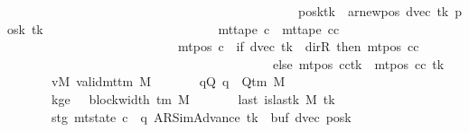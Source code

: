 \begin{isabellebody}
\ \ \ \ \ \ \ \ \ \ \ \ \ \ \ \ \ \ \ \ \ \ \ \ \ \ \ \ \ \ \ \ \ \ \ \ \ \ \ \ \ \ \ \ \ \ posk{\isacharparenleft}{\kern0pt}tk\ {\isacharcolon}{\kern0pt}{\isacharequal}{\kern0pt}\ ar{\isacharunderscore}{\kern0pt}newpos\ {\isacharparenleft}{\kern0pt}dvec\ tk{\isacharparenright}{\kern0pt}\ {\isacharparenleft}{\kern0pt}posk\ tk{\isacharparenright}{\kern0pt}{\isacharparenright}{\kern0pt}{\isacharparenright}{\kern0pt}\isanewline
\ \ \ \ \ \ \ \ \ \ \ \ \ \ \ \ \ \ \ \ \ \ \ \ \ \ {\isasymand}\ mt{\isacharunderscore}{\kern0pt}tape\ c{\isacharprime}{\kern0pt}{\isacharprime}{\kern0pt}\ {\isacharequal}{\kern0pt}\ mt{\isacharunderscore}{\kern0pt}tape\ cc\isanewline
\ \ \ \ \ \ \ \ \ \ \ \ \ \ \ \ \ \ \ \ \ \ \ \ \ \ {\isasymand}\ mt{\isacharunderscore}{\kern0pt}pos\ c{\isacharprime}{\kern0pt}{\isacharprime}{\kern0pt}\ {\isacharequal}{\kern0pt}\ {\isacharparenleft}{\kern0pt}if\ dvec\ tk\ {\isacharequal}{\kern0pt}\ dir{\isachardot}{\kern0pt}R\ then\ mt{\isacharunderscore}{\kern0pt}pos\ cc\isanewline
\ \ \ \ \ \ \ \ \ \ \ \ \ \ \ \ \ \ \ \ \ \ \ \ \ \ \ \ \ \ \ \ \ \ \ \ \ \ \ \ \ \ else\ {\isacharparenleft}{\kern0pt}mt{\isacharunderscore}{\kern0pt}pos\ cc{\isacharparenright}{\kern0pt}{\isacharparenleft}{\kern0pt}tk\ {\isacharcolon}{\kern0pt}{\isacharequal}{\kern0pt}\ mt{\isacharunderscore}{\kern0pt}pos\ cc\ tk\ {\isacharminus}{\kern0pt}\ {}{\isacharparenright}{\kern0pt}{\isacharparenright}{\kern0pt}{\isachardoublequoteclose}\isanewline
\ \ \ \ \ \ \ vM{\isacharcolon}{\kern0pt}\ {\isachardoublequoteopen}valid{\isacharunderscore}{\kern0pt}mttm\ M{\isachardoublequoteclose}\isanewline
\ \ \ \ \ \ \ qQ{\isacharcolon}{\kern0pt}\ {\isachardoublequoteopen}q\ {\isasymin}\ Q{\isacharunderscore}{\kern0pt}tm\ M{\isachardoublequoteclose}\isanewline
\ \ \ \ \ \ \ kge{}{\isacharcolon}{\kern0pt}\ {\isachardoublequoteopen}{}\ {\isasymle}\ block{\isacharunderscore}{\kern0pt}width\ {\isacharparenleft}{\kern0pt}{\isasymGamma}{\isacharunderscore}{\kern0pt}tm\ M{\isacharparenright}{\kern0pt}{\isachardoublequoteclose}\isanewline
\ \ \ \ \ \ \ last{\isacharcolon}{\kern0pt}\ {\isachardoublequoteopen}is{\isacharunderscore}{\kern0pt}last{\isacharunderscore}{\kern0pt}k\ M\ tk{\isachardoublequoteclose}\isanewline
\ \ \ \ \ \ \ stg{\isacharcolon}{\kern0pt}\ {\isachardoublequoteopen}mt{\isacharunderscore}{\kern0pt}state\ c{}\ {\isacharequal}{\kern0pt}\ {\isacharparenleft}{\kern0pt}q{\isacharcomma}{\kern0pt}\ AR{\isacharunderscore}{\kern0pt}SimAdvance{\isacharcomma}{\kern0pt}\ tk{\isacharcomma}{\kern0pt}\ {}{\isacharcomma}{\kern0pt}\ buf{\isacharcomma}{\kern0pt}\ dvec{\isacharcomma}{\kern0pt}\ posk{\isacharparenright}{\kern0pt}{\isachardoublequoteclose}\isanewline

\end{isabellebody}
